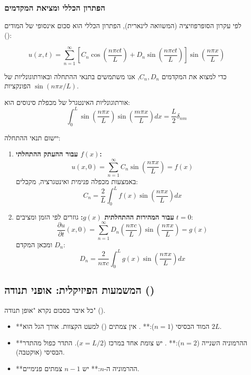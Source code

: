 \subsubsection{הפתרון הכללי ומציאת המקדמים}
לפי עקרון הסופרפוזיציה (המשוואה לינארית), הפתרון הכללי הוא סכום אינסופי של המודים ():

$$u(x,t) = \sum_{n=1}^{\infty} \left[ C_n \cos\left(\frac{n\pi c t}{L}\right) + D_n \sin\left(\frac{n\pi c t}{L}\right) \right] \sin\left(\frac{n\pi x}{L}\right)$$

כדי למצוא את המקדמים $C_n, D_n$, אנו משתמשים בתנאי ההתחלה ובאורתוגונליות של הפונקציות $\sin(n\pi x/L)$.

\begin{notebox}{אורתוגונליות}
האינטגרל של מכפלת סינוסים הוא:
$$\int_0^L \sin\left(\frac{n\pi x}{L}\right) \sin\left(\frac{m\pi x}{L}\right) dx = \frac{L}{2} \delta_{nm}$$
\end{notebox}

יישום תנאי ההתחלה:
\begin{enumerate}
    \item \textbf{עבור ההעתק ההתחלתי $f(x)$:}
    $$u(x,0) = \sum_{n=1}^{\infty} C_n \sin\left(\frac{n\pi x}{L}\right) = f(x)$$
    באמצעות מכפלה פנימית ואינטגרציה, מקבלים:
    $$C_n = \frac{2}{L} \int_0^L f(x) \sin\left(\frac{n\pi x}{L}\right) dx$$

    \item \textbf{עבור המהירות ההתחלתית $g(x)$:}
    גוזרים לפי הזמן ומציבים $t=0$:
    $$\frac{\partial u}{\partial t}(x,0) = \sum_{n=1}^{\infty} D_n \left(\frac{n\pi c}{L}\right) \sin\left(\frac{n\pi x}{L}\right) = g(x)$$
    ומכאן המקדם $D_n$:
    $$D_n = \frac{2}{n\pi c} \int_0^L g(x) \sin\left(\frac{n\pi x}{L}\right) dx$$
\end{enumerate}

\subsection{המשמעות הפיזיקלית: אופני תנודה ()}
כל איבר בסכום נקרא "אופן תנודה" ().
\begin{itemize}
    \item **המוד הבסיסי ($n=1$):** . אין צמתים () למעט הקצוות. אורך הגל הוא $2L$.
    \item **ההרמוניה השנייה ($n=2$):** . יש צומת אחד במרכז ($x=L/2$). התדר כפול מהתדר הבסיסי (אוקטבה).
    \item **ההרמוניה ה-$n$:** יש $n-1$ צמתים פנימיים.
\end{itemize}

